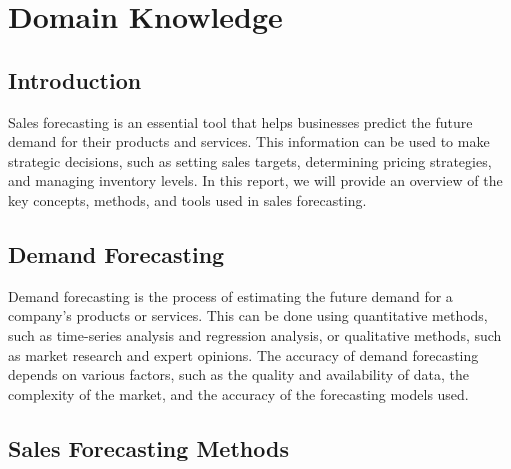 %
%

\chapter{Domain Knowledge}

\section{Introduction}

Sales forecasting is an essential tool that helps businesses predict the future demand for their products and services. This information can be used to make strategic decisions, such as setting sales targets, determining pricing strategies, and managing inventory levels. In this report, we will provide an overview of the key concepts, methods, and tools used in sales forecasting.

\section{Demand Forecasting}

Demand forecasting is the process of estimating the future demand for a company's products or services. This can be done using quantitative methods, such as time-series analysis and regression analysis, or qualitative methods, such as market research and expert opinions. The accuracy of demand forecasting depends on various factors, such as the quality and availability of data, the complexity of the market, and the accuracy of the forecasting models used.

\section{Sales Forecasting Methods}

